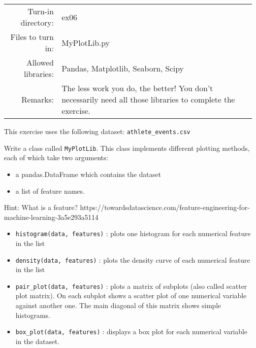 \documentclass[]{article}
\begin{document}
\begin{longtable}[]{@{}rl@{}}
\toprule
\endhead
\begin{minipage}[t]{0.54\columnwidth}\raggedleft
Turn-in directory:\strut
\end{minipage} & \begin{minipage}[t]{0.40\columnwidth}\raggedright
ex06\strut
\end{minipage}\tabularnewline
\begin{minipage}[t]{0.54\columnwidth}\raggedleft
Files to turn in:\strut
\end{minipage} & \begin{minipage}[t]{0.40\columnwidth}\raggedright
MyPlotLib.py\strut
\end{minipage}\tabularnewline
\begin{minipage}[t]{0.54\columnwidth}\raggedleft
Allowed libraries:\strut
\end{minipage} & \begin{minipage}[t]{0.40\columnwidth}\raggedright
Pandas, Matplotlib, Seaborn, Scipy\strut
\end{minipage}\tabularnewline
\begin{minipage}[t]{0.54\columnwidth}\raggedleft
Remarks:\strut
\end{minipage} & \begin{minipage}[t]{0.40\columnwidth}\raggedright
The less work you do, the better! You don't necessarily need all those
libraries to complete the exercise.\strut
\end{minipage}\tabularnewline
\bottomrule
\end{longtable}

This exercise uses the following dataset: \texttt{athlete\_events.csv}

Write a class called \texttt{MyPlotLib}. This class implements different
plotting methods, each of which take two arguments:

\begin{itemize}
\item
  a pandas.DataFrame which contains the dataset
\item
  a list of feature names.
\end{itemize}

Hint: What is a feature?
https://towardsdatascience.com/feature-engineering-for-machine-learning-3a5e293a5114

\begin{itemize}
\item
  \texttt{histogram(data,\ features)} : plots one histogram for each
  numerical feature in the list
\item
  \texttt{density(data,\ features)} : plots the density curve of each
  numerical feature in the list
\item
  \texttt{pair\_plot(data,\ features)} : plots a matrix of subplots
  (also called scatter plot matrix). On each subplot shows a scatter
  plot of one numerical variable against another one. The main diagonal
  of this matrix shows simple histograms.
\item
  \texttt{box\_plot(data,\ features)} : displays a box plot for each
  numerical variable in the dataset.
\end{itemize}
\end{document}
